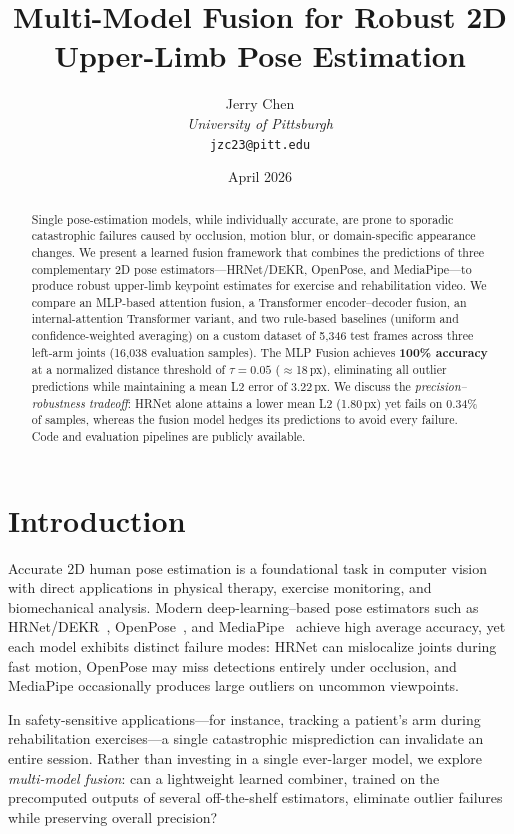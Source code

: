 \documentclass[11pt,a4paper]{article}
\title{\textbf{Multi-Model Fusion for Robust 2D Upper-Limb Pose Estimation}}
\author{
    Jerry Chen \\
    \textit{University of Pittsburgh} \\
    \texttt{jzc23@pitt.edu}
}
\date{April 2026}
\begin{document}
\maketitle

\begin{abstract}
Single pose-estimation models, while individually accurate, are prone to
sporadic catastrophic failures caused by occlusion, motion blur, or
domain-specific appearance changes.  We present a learned fusion framework
that combines the predictions of three complementary 2D pose estimators---HRNet/DEKR,
OpenPose, and MediaPipe---to produce robust upper-limb keypoint estimates for
exercise and rehabilitation video.  We compare an MLP-based attention fusion, a
Transformer encoder--decoder fusion, an internal-attention Transformer variant,
and two rule-based baselines (uniform and confidence-weighted averaging) on a
custom dataset of 5{,}346 test frames across three left-arm joints (16{,}038
evaluation samples).  The MLP Fusion achieves \textbf{100\% accuracy} at a
normalized distance threshold of $\tau{=}0.05$ ($\approx$18\,px), eliminating
all outlier predictions while maintaining a mean L2 error of 3.22\,px.  We
discuss the \emph{precision--robustness tradeoff}: HRNet alone attains a lower
mean L2 (1.80\,px) yet fails on 0.34\% of samples, whereas the fusion model
hedges its predictions to avoid every failure.  Code and evaluation pipelines
are publicly available.
\end{abstract}

\section{Introduction}\label{sec:intro}

Accurate 2D human pose estimation is a foundational task in computer vision
with direct applications in physical therapy, exercise monitoring, and
biomechanical analysis.  Modern deep-learning--based pose estimators such as
HRNet/DEKR~\cite{geng2021dekr, sun2019hrnet}, OpenPose~\cite{cao2017openpose},
and MediaPipe~\cite{lugaresi2019mediapipe} achieve high average accuracy, yet
each model exhibits distinct failure modes: HRNet can mislocalize joints during
fast motion, OpenPose may miss detections entirely under occlusion, and
MediaPipe occasionally produces large outliers on uncommon viewpoints.

In safety-sensitive applications---for instance, tracking a patient's arm
during rehabilitation exercises---a single catastrophic misprediction can
invalidate an entire session.  Rather than investing in a single
ever-larger model, we explore \emph{multi-model fusion}: can a lightweight
learned combiner, trained on the precomputed outputs of several off-the-shelf
estimators, eliminate outlier failures while preserving overall precision?
\end{document}
